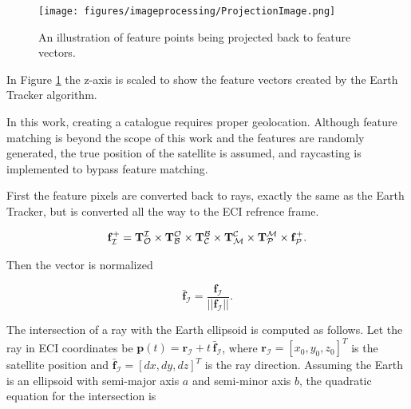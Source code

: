 \begin{figure}[H]
    \centering
    \texttt{[image: figures/imageprocessing/ProjectionImage.png]}
    \caption{An illustration of feature points being projected back to feature vectors.}
    \label{fig:ProjectionPoints}
\end{figure}

\noindent
In Figure \ref{fig:ProjectionPoints} the z-axis is scaled to show the feature vectors created by the Earth Tracker algorithm.
\label{sec:CatalogueGeneration}

In this work, creating a catalogue requires proper geolocation. Although feature matching is beyond the scope of this work and the features are randomly 
generated, the true position of the satellite is assumed, and raycasting is implemented to bypass feature matching.
\vspace{0.5cm}

\noindent
First the feature pixels are converted back to rays, exactly the same as the Earth Tracker, but is converted all the way to the ECI refrence frame.

\begin{equation}
        \mathbf{f}_\mathcal{I}^+ = \mathbf{T}_\mathcal{O}^\mathcal{I} \times \mathbf{T}_\mathcal{B}^\mathcal{O} \times \mathbf{T}_\mathcal{C}^\mathcal{B} \times \mathbf{T}_\mathcal{M}^\mathcal{C} \times 
        \mathbf{T}_\mathcal{P}^\mathcal{M} \times \mathbf{f}_\mathcal{P}^+ \text{.} \\
\end{equation}

\noindent
Then the vector is normalized

\begin{equation}
    \bar{\mathbf{f}}_\mathcal{I} =  \frac{\mathbf{f}_\mathcal{I}}{||\mathbf{f}_\mathcal{I}||} \text{.}
\end{equation}

\noindent
The intersection of a ray with the Earth ellipsoid is computed as follows. Let the ray in ECI coordinates be $\mathbf{p}(t) = \mathbf{r}_\mathcal{I} + t \, \bar{\mathbf{f}}_\mathcal{I}$, 
where $\mathbf{r}_\mathcal{I} = [x_0, y_0, z_0]^T$ is the satellite position and $\bar{\mathbf{f}}_\mathcal{I} = [dx, dy, dz]^T$ is the ray direction. 
Assuming the Earth is an ellipsoid with semi-major axis $a$ and semi-minor axis $b$, the quadratic equation for the intersection is

